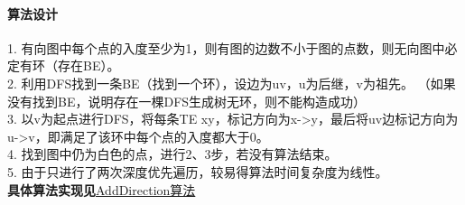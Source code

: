 \documentclass[11pt,a4paper,oneside,oldfontcommands]{ctexart}
\begin{document}
\paragraph{算法设计}
1. 有向图中每个点的入度至少为1，则有图的边数不小于图的点数，则无向图中必定有环（存在BE）。\\
2. 利用DFS找到一条BE（找到一个环），设边为uv，u为后继，v为祖先。
（如果没有找到BE，说明存在一棵DFS生成树无环，则不能构造成功）\\
3. 以v为起点进行DFS，将每条TE xy，标记方向为x->y，最后将uv边标记方向为u->v，即满足了该环中每个点的入度都大于0。\\
4. 找到图中仍为白色的点，进行2、3步，若没有算法结束。\\
5. 由于只进行了两次深度优先遍历，较易得算法时间复杂度为线性。\\
\textbf{具体算法实现见}\hyperref[AddDirection]{AddDirection算法}\\
\end{document}
